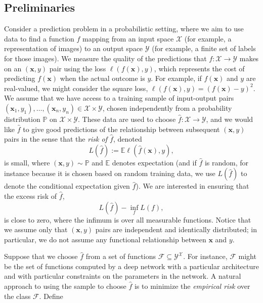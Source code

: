 \subsection{Preliminaries}

Consider a prediction problem in a probabilistic setting, where we aim to use data to find a function $f$ mapping from an input space
${\mathcal X}$ (for example, a representation of images) to an output space
${\mathcal Y}$ (for example, a finite set of labels for those images). We measure the quality of the predictions that $f:{\mathcal X}\to{\mathcal Y}$ makes on an $({\boldsymbol x},y)$ pair using the loss $\ell(f({\boldsymbol x}),y)$, which represents the cost of predicting $f({\boldsymbol x})$ when the actual outcome is $y$. For example, if $f({\boldsymbol x})$ and $y$ are real-valued, we might consider the square loss, $\ell(f({\boldsymbol x}),y)=(f({\boldsymbol x})-y)^2$. We assume that we have access to a training sample of input-output pairs $({\boldsymbol x}_1,y_1),
\ldots,({\boldsymbol x}_n,y_n)\in{\mathcal X}\times{\mathcal Y}$, chosen independently from a probability distribution $\mathbb{P}$ on ${\mathcal X}\times{\mathcal Y}$. These data are used to choose $\widehat f:{\mathcal X}\to{\mathcal Y}$, and we would like $\widehat f$ to give good predictions of the relationship between subsequent $({\boldsymbol x},y)$ pairs in the sense that the {\em risk of $\widehat f$}, denoted
  \[
    L(\widehat f):= {\mathbb E}\ell(\widehat f({\boldsymbol x}),y),
  \]
is small, where $({\boldsymbol x},y)\sim \mathbb{P}$ and ${\mathbb E}$ denotes expectation (and if $\widehat f$ is random, for instance because it is chosen based on random training data, we use $L(\widehat f)$ to denote the conditional expectation given $\widehat f$).  We are interested in ensuring that the excess risk of $\widehat f$,
  \[
    L(\widehat f) - \inf_{f}L(f),
  \]
is close to zero, where the infimum is over all measurable functions. Notice that we assume only that $({\boldsymbol x},y)$ pairs are independent and identically distributed; in particular, we do not assume any functional relationship between ${\boldsymbol x}$ and $y$.

Suppose that we choose $\widehat f$ from a set of functions
${\mathcal F}\subseteq{\mathcal Y}^{\mathcal X}$. For instance, ${\mathcal F}$ might be the set of functions computed by a deep network with a particular architecture and with particular constraints on the parameters in the network. A natural approach to using the sample to choose $\widehat f$ is to minimize the {\em empirical risk} over the class ${\mathcal F}$. Define

